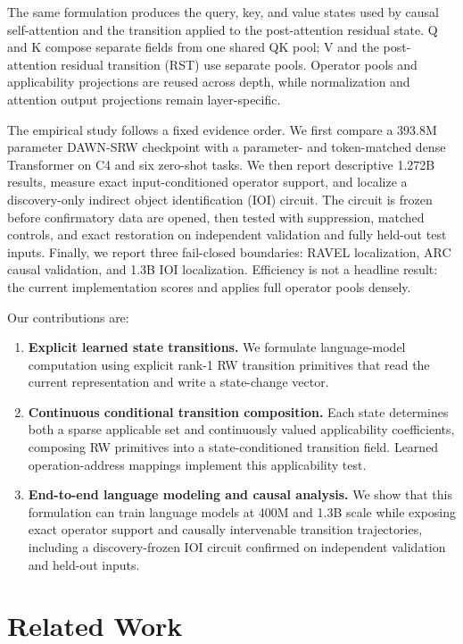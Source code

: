 \documentclass{article}
\newcommand{\DAWN}{DAWN-SRW}
\begin{document}
The same formulation produces the query, key, and value states used by causal
self-attention and the transition applied to the post-attention residual state.
Q and K compose separate fields from one shared QK pool; V and the
post-attention residual transition (RST) use separate pools. Operator pools and
applicability projections are reused across depth, while normalization and
attention output projections remain layer-specific.

The empirical study follows a fixed evidence order. We first compare a 393.8M
parameter \DAWN{} checkpoint with a parameter- and token-matched dense
Transformer on C4 and six zero-shot tasks. We then report descriptive 1.272B
results, measure exact input-conditioned operator support, and localize a
discovery-only indirect object identification (IOI) circuit. The circuit is
frozen before confirmatory data are opened, then tested with suppression,
matched controls, and exact restoration on independent validation and fully
held-out test inputs. Finally, we report three fail-closed boundaries: RAVEL
localization, ARC causal validation, and 1.3B IOI localization. Efficiency is
not a headline result: the current implementation scores and applies full
operator pools densely.

Our contributions are:
\begin{enumerate}
    \item \textbf{Explicit learned state transitions.} We formulate
    language-model computation using explicit rank-1 RW transition primitives
    that read the current representation and write a state-change vector.
    \item \textbf{Continuous conditional transition composition.} Each state
    determines both a sparse applicable set and continuously valued
    applicability coefficients, composing RW primitives into a
    state-conditioned transition field. Learned operation-address mappings
    implement this applicability test.
    \item \textbf{End-to-end language modeling and causal analysis.} We show
    that this formulation can train language models at 400M and 1.3B scale while
    exposing exact operator support and causally intervenable transition
    trajectories, including a discovery-frozen IOI circuit confirmed on
    independent validation and held-out inputs.
\end{enumerate}

\section{Related Work}
\label{sec:related}
\end{document}
